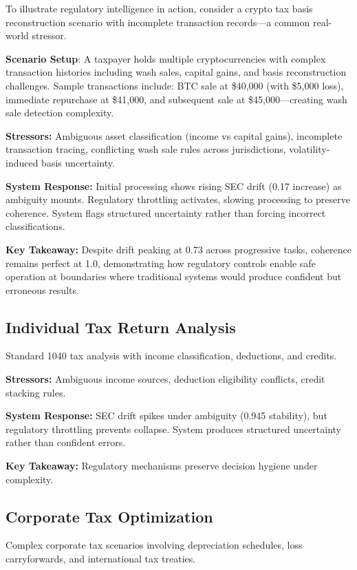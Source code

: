 \documentclass[12pt,a4paper]{article}
\begin{document}
To illustrate regulatory intelligence in action, consider a crypto tax basis reconstruction scenario with incomplete transaction records—a common real-world stressor.

\textbf{Scenario Setup}: A taxpayer holds multiple cryptocurrencies with complex transaction histories including wash sales, capital gains, and basis reconstruction challenges. Sample transactions include: BTC sale at \$40,000 (with \$5,000 loss), immediate repurchase at \$41,000, and subsequent sale at \$45,000—creating wash sale detection complexity.

\textbf{Stressors:} Ambiguous asset classification (income vs capital gains), incomplete transaction tracing, conflicting wash sale rules across jurisdictions, volatility-induced basis uncertainty.

\textbf{System Response:} Initial processing shows rising SEC drift (0.17 increase) as ambiguity mounts. Regulatory throttling activates, slowing processing to preserve coherence. System flags structured uncertainty rather than forcing incorrect classifications.

\textbf{Key Takeaway:} Despite drift peaking at 0.73 across progressive tasks, coherence remains perfect at 1.0, demonstrating how regulatory controls enable safe operation at boundaries where traditional systems would produce confident but erroneous results.

\subsection{Individual Tax Return Analysis}

Standard 1040 tax analysis with income classification, deductions, and credits.

\textbf{Stressors:} Ambiguous income sources, deduction eligibility conflicts, credit stacking rules.

\textbf{System Response:} SEC drift spikes under ambiguity (0.945 stability), but regulatory throttling prevents collapse. System produces structured uncertainty rather than confident errors.

\textbf{Key Takeaway:} Regulatory mechanisms preserve decision hygiene under complexity.

\subsection{Corporate Tax Optimization}

Complex corporate tax scenarios involving depreciation schedules, loss carryforwards, and international tax treaties.
\end{document}
